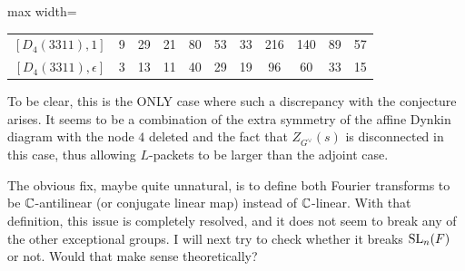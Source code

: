 \begin{table}[ht]
\begin{adjustbox}{max width=\linewidth}
\begin{tabular}{|c|cccccccccc|}
    $[D_4(3311), 1]$       & 9 & 29 & 21 & 80 & 53 & 33 & 216 & 140 & 89 & 57 \\
    $[D_4(3311), \epsilon]$ & 3 & 13 & 11 & 40 & 29 & 19 & 96 & 60 & 33 & 15 \\ \hline

    \end{tabular}
    \end{adjustbox}
\end{table}

To be clear, this is the ONLY case where such a discrepancy with the conjecture arises. It seems to be a combination of the extra symmetry of the affine Dynkin diagram with the node $4$ deleted and the fact that $Z_{G^\vee}(s)$ is disconnected in this case, thus allowing $L$-packets to be larger than the adjoint case. 

The obvious fix, maybe quite unnatural, is to define both Fourier transforms to be $\mathbb{C}$-antilinear (or conjugate linear map) instead of $\mathbb{C}$-linear. With that definition, this issue is completely resolved, and it does not seem to break any of the other exceptional groups. I will next try to check whether it breaks $\mathrm{SL}_n(F)$ or not. Would that make sense theoretically?



